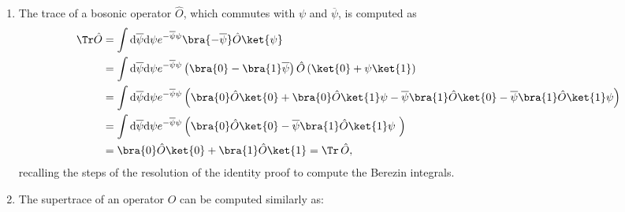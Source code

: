 \begin{enumerate}[start=0]
          \[
              \frac{\partial_L}{\partial \overline{\psi}} \frac{\partial_L}{\partial \psi} \left( 1 - \overline{\psi} \psi \right) \left( \ket{0}\bra{0} + \overline{\psi} \ket{0}\bra{1} + \psi \ket{1}\bra{0} + \psi \overline{\psi} \ket{1}\bra{1} \right),
          \]
          from which, since grassmann variables square to zero and the terms without both of the variables cancels out when derived, only two terms survive the differentiation:
          \[
              \mathbb{I} = \frac{\partial_L}{\partial \psi} \frac{\partial_L}{\partial \overline{\psi}} \left( \psi \overline{\psi} \ket{1}\bra{1} - \overline{\psi} \psi \ket{0}\bra{0} \right) = \ket{0}\bra{0} + \ket{1}\bra{1}.
          \]
    \item The trace of a bosonic operator \(\hat{O}\), which commutes with \(\psi\) and \(\overline{\psi}\), is computed as
          \[
              \begin{aligned}
                  \Tr \hat{O} & = \int \mathrm{d} \overline{\psi} \mathrm{d} \psi e^{-\overline{\psi} \psi} \bra{-\overline{\psi}} \hat{O} \ket{\psi}                                                                                                                      \\
                              & = \int \mathrm{d} \overline{\psi} \mathrm{d} \psi e^{-\overline{\psi} \psi} \left( \bra{0} - \bra{1} \overline{\psi} \right) \hat{O} \left( \ket{0} + \psi \ket{1} \right)                                                                 \\
                              & = \int \mathrm{d} \overline{\psi} \mathrm{d} \psi e^{-\overline{\psi} \psi} \left( \bra{0} \hat{O} \ket{0} + \bra{0} \hat{O} \ket{1} \psi - \overline{\psi} \bra{1} \hat{O} \ket{0} - \overline{\psi} \bra{1} \hat{O} \ket{1} \psi \right) \\
                              & = \int \mathrm{d} \overline{\psi} \mathrm{d} \psi e^{-\overline{\psi} \psi} \left( \bra{0} \hat{O} \ket{0} - \overline{\psi} \bra{1} \hat{O} \ket{1} \psi  \right)                                                                         \\
                              & = \bra{0} \hat{O} \ket{0} + \bra{1} \hat{O} \ket{1} = \Tr\,\hat{O},
              \end{aligned}
          \]
          recalling the steps of the resolution of the identity proof to compute the Berezin integrals.
    \item The supertrace of an operator \(\hat{O}\) can be computed similarly as:

\end{enumerate}
